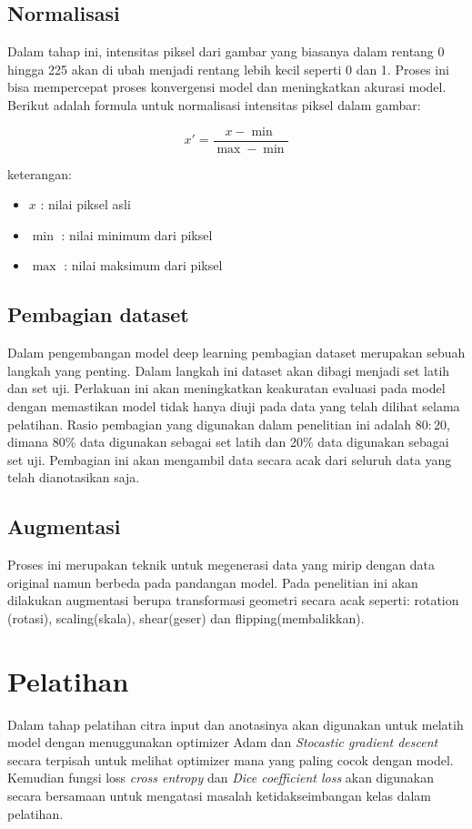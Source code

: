 \subsection{Normalisasi}

\noindent Dalam tahap ini, intensitas piksel dari gambar yang biasanya dalam rentang 0 hingga 225 akan di ubah menjadi rentang lebih kecil seperti 0 dan 1. Proses ini bisa mempercepat proses konvergensi model dan meningkatkan akurasi model. Berikut adalah formula untuk normalisasi intensitas piksel dalam gambar:

\begin{equation}
	x' = \frac{x - \min}{\max - \min}
\end{equation}

\noindent
keterangan:
\begin{itemize}
	\item $x$ : nilai piksel asli
	\item $\min$ : nilai minimum dari piksel
	\item $\max$ : nilai maksimum dari piksel
\end{itemize}


\subsection{Pembagian dataset}

\noindent Dalam pengembangan model deep learning pembagian dataset merupakan sebuah langkah yang penting. Dalam langkah ini dataset akan dibagi menjadi set latih dan set uji. Perlakuan ini akan meningkatkan keakuratan evaluasi pada model dengan memastikan model tidak hanya diuji pada data yang telah dilihat selama pelatihan. Rasio pembagian yang digunakan dalam penelitian ini adalah \(80:20\), dimana 80\% data digunakan sebagai set latih dan 20\% data digunakan sebagai set uji. Pembagian ini akan mengambil data secara acak dari seluruh data yang telah dianotasikan saja. 

\subsection{Augmentasi}

\noindent Proses ini merupakan teknik untuk megenerasi  data yang mirip dengan data original namun berbeda pada pandangan model. Pada penelitian ini akan dilakukan augmentasi berupa transformasi geometri secara acak seperti: rotation (rotasi), scaling(skala), shear(geser) dan flipping(membalikkan).

\section{Pelatihan}
Dalam tahap pelatihan citra input dan anotasinya akan digunakan untuk melatih model dengan menuggunakan optimizer Adam dan \textit{Stocastic gradient descent} secara terpisah untuk melihat optimizer mana yang paling cocok dengan model. Kemudian fungsi loss \textit{cross entropy} dan \textit{Dice coefficient loss} akan digunakan secara bersamaan untuk mengatasi masalah ketidakseimbangan kelas dalam pelatihan.


